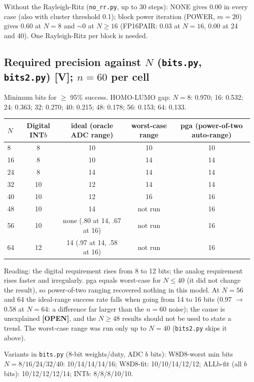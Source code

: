 \documentclass[11pt]{article}
\newcommand{\OPEN}{\textbf{[OPEN]}}
\newcommand{\scr}[1]{\texttt{#1}}
\begin{document}
Without the Rayleigh-Ritz (\scr{no\_rr.py}, up to 30 steps): NONE gives 0.00 in every case (also with cluster threshold 0.1); block power iteration (POWER, $m = 20$) gives 0.60 at $N = 8$ and $\sim$0 at $N \geq 16$ (FP16PAIR: 0.03 at $N = 16$, 0.00 at 24 and 40). One Rayleigh-Ritz per block is needed.

\subsection{Required precision against $N$ (\scr{bits.py}, \scr{bits2.py}) [V]; $n = 60$ per cell}\label{sec:bits}

Minimum bits for $\geq$ 95\% success. HOMO-LUMO gap: $N = 8$: 0.970; 16: 0.532; 24: 0.363; 32: 0.270; 40: 0.215; 48: 0.178; 56: 0.153; 64: 0.133.

\begin{center}
\small
\begin{tabular}{lcccc}
\toprule
$N$ & Digital INT$b$ & ideal (oracle ADC range) & worst-case range & pga (power-of-two auto-range) \\
\midrule
8 & 8 & 10 & 10 & 10 \\
16 & 8 & 10 & 14 & 14 \\
24 & 8 & 14 & 14 & 14 \\
32 & 10 & 12 & 14 & 14 \\
40 & 10 & 12 & 16 & 16 \\
48 & 10 & 14 & not run & 16 \\
56 & 10 & none (.80 at 14, .67 at 16) & not run & 16 \\
64 & 12 & 14 (.97 at 14, .58 at 16) & not run & 16 \\
\bottomrule
\end{tabular}
\end{center}

Reading: the digital requirement rises from 8 to 12 bits; the analog requirement rises faster and irregularly. pga equals worst-case for $N \leq 40$ (it did not change the result), so power-of-two ranging recovered nothing in this model. At $N = 56$ and 64 the ideal-range success rate falls when going from 14 to 16 bits (0.97 $\to$ 0.58 at $N = 64$: a difference far larger than the $n = 60$ noise); the cause is unexplained \OPEN, and the $N \geq 48$ results should not be used to state a trend. The worst-case range was run only up to $N = 40$ (\scr{bits2.py} skips it above).

Variants in \scr{bits.py} (8-bit weights/duty, ADC $b$ bits): W8D8-worst min bits $N = 8/16/24/32/40$: 10/14/14/14/16; W8D8-fit: 10/10/14/12/12; ALLb-fit (all $b$ bits): 10/12/12/12/14; INT$b$: 8/8/8/10/10.
\end{document}

